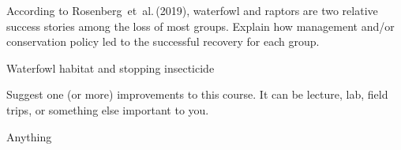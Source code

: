 \documentclass[12pt, addpoints]{exam}
\newcommand*\AnswerBox[2]{%
    \parbox[t][#1]{0.92\textwidth}{%
    \begin{solution}#2\end{solution}}
    \vspace{\stretch{1}}
}
\newcommand{\bumppoints}[1]{%
	\addtocounter{numpoints}{#1}
}
\begin{document}
\begin{questions}
\question[10]
According to Rosenberg~et~al.\,(2019), waterfowl and raptors are two relative success stories among the loss of most groups. Explain how management and/or conservation policy led to the successful recovery for each group.


\AnswerBox{0.5\textheight}{Waterfowl habitat and stopping insecticide}


\bonusquestion[2]
Suggest one (or more) improvements to this course. It can be lecture, lab, field trips, or something else important to you.

\AnswerBox{0.1\textheight}{Anything}




\end{questions}

\end{document}
